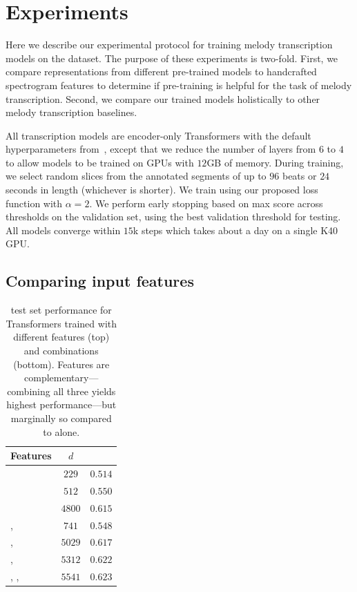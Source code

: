 \section{Experiments}
\label{sec:experiments}

Here we describe our experimental protocol for training melody transcription models on the \hooktheory{} dataset. 
The purpose of these experiments is two-fold. 
First, we compare representations from different pre-trained models to handcrafted spectrogram features to determine if pre-training is helpful for the task of melody transcription. 
Second, we compare our trained models holistically to other melody transcription baselines. 

All transcription models are encoder-only Transformers with the default hyperparameters from~\cite{vaswani2017attention}, 
except that we reduce the number of layers from $6$ to $4$ to allow models to be trained on GPUs with $12$GB of memory. 
During training, we select random slices from the annotated segments of up to $96$ beats or $24$ seconds in length (whichever is shorter). 
We train using our proposed loss function with ${\alpha = 2}$. 
We perform early stopping based on max \fone{} score across thresholds on the validation set, using the best validation threshold for testing. 
All models converge within $15$k steps which takes about a day on a single K40 GPU. 

\subsection{Comparing input features}
\label{sec:exp1}

\begin{table}[t]
    \centering
    \begin{tabular}{lcc}
\toprule
Features & $d$ & \fone{} \\
\midrule
\mel{} & $229$ & $0.514$ \\
\mtthree{} & $512$ & $0.550$ \\
\jukebox{} & $4800$ & $\bm{0.615}$ \\
\midrule
\mel{}, \mtthree{} & $741$ & $0.548$ \\
\mel{}, \jukebox{} & $5029$ & $0.617$ \\
\mtthree{}, \jukebox{} & $5312$ & $0.622$ \\
\mel{}, \mtthree{}, \jukebox{} & $5541$ & $\bm{0.623}$ \\
\bottomrule
    \end{tabular}
    \caption{\hooktheory{} test set performance for Transformers trained with different features (top) and combinations (bottom). Features are complementary---combining all three yields highest performance---but marginally so compared to \jukebox{} alone.}
    \label{tab:hooktheory_test}
\end{table}

